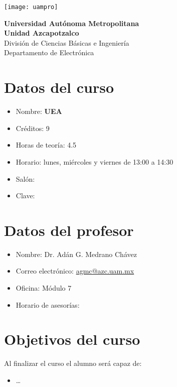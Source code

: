 \documentclass[10pt,letterpaper]{article}
\begin{document}
\begin{minipage}[b]{0.17\linewidth}
	\texttt{[image: uampro]}
\end{minipage}
\begin{minipage}[b]{0.75\linewidth}
	\large \textbf{Universidad Autónoma Metropolitana}\\ %
	{\textbf{Unidad Azcapotzalco}}\\
	\color{Black} División de Ciencias Básicas e Ingeniería\\ %
	Departamento de Electrónica
\end{minipage}
\vspace{0.2cm} 
\begin{multicols}{2}

\section*{Datos del curso}
\color{black}
\begin{itemize}
	\itemsep-0.2em
	\item Nombre: \textbf{UEA}
	\item Créditos: 9
	\item Horas de teoría: 4.5 
	\item Horario: lunes, miércoles y viernes de 13:00 a 14:30
	\item Salón: 
	\item Clave: 
\end{itemize}

\section*{Datos del profesor}
\color{black}
\begin{itemize}
  \itemsep-0.2em
  \item Nombre: Dr. Adán G. Medrano Chávez
  \item Correo electrónico: \href{mailto:agmc@azc.uam.mx}{agmc@azc.uam.mx}
  \item Oficina: Módulo 7
  \item Horario de asesorías: 
\end{itemize}

\section*{Objetivos del curso}
\color{black}
Al finalizar el curso el alumno será capaz de:
\begin{itemize}
  \itemsep-0.2em
	\item \dots
\end{itemize}


\end{multicols}
\end{document}
